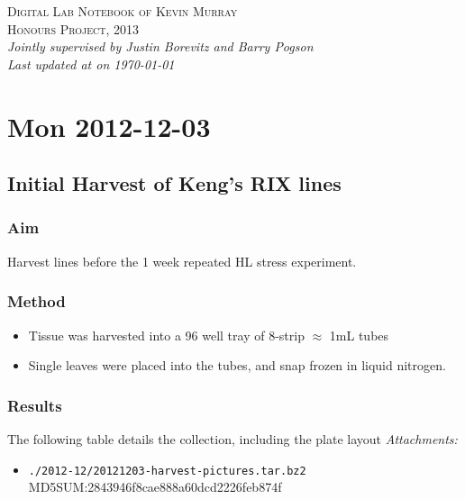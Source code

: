 \documentclass[12pt,a4paper]{book}
\begin{document}
\setlength{\parindent}{0cm}

\begin{titlepage}
  \begin{center}
    \textsc{\LARGE Digital Lab Notebook of Kevin Murray}\\[1.5cm]
    \textsc{\Large Honours Project, 2013}\\[0.5cm]
    \textit{Jointly supervised by Justin Borevitz and Barry Pogson}\\
    \vfill
    \textit{Last updated at \currenttime on \today}\\
  \end{center}
\end{titlepage}

\chapter*{Mon 2012-12-03}
  \section*{Initial Harvest of Keng's RIX lines}
    \subsection*{Aim}
      Harvest lines before the 1 week repeated HL stress experiment.
    \subsection*{Method}
      \begin{itemize} \itemsep1pt \parskip0pt 
        \item Tissue was harvested into a 96 well tray of 8-strip $\approx$ 1mL tubes
        \item Single leaves were placed into the tubes, and snap frozen in liquid nitrogen.
      \end{itemize}
    \subsection*{Results}
      The following table details the collection, including the plate layout
      \emph{Attachments:}
      \begin{itemize} \itemsep1pt \parskip0pt 
        \item \verb+./2012-12/20121203-harvest-pictures.tar.bz2+ \hfill
          MD5SUM:2843946f8cae888a60dcd2226feb874f
      \end{itemize}
\end{document}
